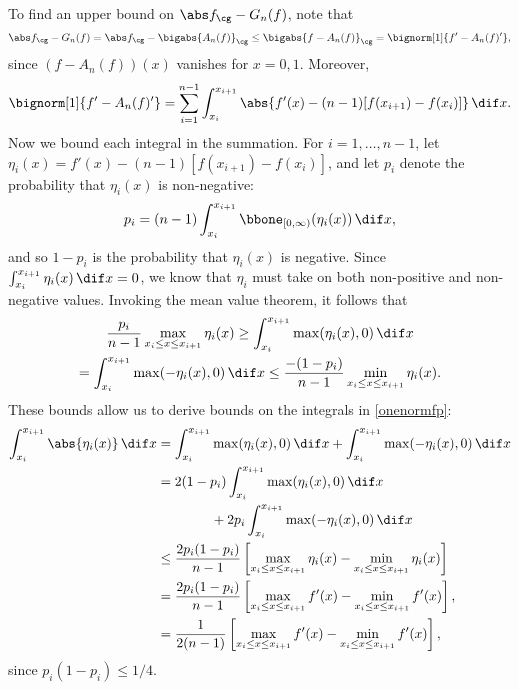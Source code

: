 To find an upper bound on $\Gnorm{f}-G_{n}(f)$, note that
\begin{equation*}
\Gnorm{f} - G_{n}(f) = \Gnorm{f} - \bigabs{A_n(f)}_{\cg} \le \bigabs{f-A_n(f)}_{\cg} = \bignorm[1]{f' -A_n(f)'},
\end{equation*}
since $(f-A_n(f))(x)$ vanishes for $x=0,1$.  Moreover,
\begin{equation} \label{onenormfp}
\bignorm[1]{f' -A_n(f)'} = \sum_{i=1}^{n-1} \int_{x_i}^{x_{i+1}} \abs{f'(x) -(n-1)[f(x_{i+1})-f(x_i)]} \, \dif x.
\end{equation}
Now we bound each integral in the summation.  For $i=1, \ldots, n-1$, let $\eta_i(x) = f'(x) -(n-1)[f(x_{i+1})-f(x_i)]$, and let $p_i$ denote the probability that $\eta_i(x)$ is non-negative:
\[
p_i = (n-1)\int_{x_i}^{x_{i+1}} \bbone_{[0,\infty)} (\eta_i(x)) \, \dif x,
\]
and so $1-p_i$ is the probability that $\eta_i(x)$ is negative.  Since $\int_{x_i}^{x_{i+1}} \eta_i(x) \, \dif x =0$, we know that $\eta_i$ must take on both non-positive and non-negative values.  Invoking the mean value theorem, it follows that
\begin{multline*}
\frac{p_i}{n-1} \max_{x_i \le x \le x_{i+1}} \eta_i(x) \ge \int_{x_i}^{x_{i+1}} \max(\eta_i(x),0) \, \dif x \\
= \int_{x_i}^{x_{i+1}} \max(-\eta_i(x),0) \, \dif x \le \frac{-(1-p_i)}{n-1} \min_{x_i \le x \le x_{i+1}} \eta_i(x) .
\end{multline*}
These bounds allow us to derive bounds on the integrals in \eqref{onenormfp}:
\begin{align*}
\int_{x_i}^{x_{i+1}} \abs{\eta_i(x)} \, \dif x &= \int_{x_i}^{x_{i+1}} \max(\eta_i(x),0) \, \dif x + \int_{x_i}^{x_{i+1}} \max(-\eta_i(x),0) \, \dif x\\
&=2(1-p_i) \int_{x_i}^{x_{i+1}} \max(\eta_i(x),0) \, \dif x \\
& \qquad \qquad + 2p_i\int_{x_i}^{x_{i+1}} \max(-\eta_i(x),0) \, \dif x\\
&\le \frac{2p_i(1-p_i)}{n-1} \left[ \max_{x_i \le x \le x_{i+1}} \eta_i(x) - \min_{x_i \le x \le x_{i+1}} \eta_i(x) \right]\\
&=\frac{2p_i(1-p_i)}{n-1} \left[ \max_{x_i \le x \le x_{i+1}} f'(x) - \min_{x_i \le x \le x_{i+1}} f'(x) \right], \\
&=\frac{1}{2(n-1)} \left[ \max_{x_i \le x \le x_{i+1}} f'(x) - \min_{x_i \le x \le x_{i+1}} f'(x) \right],
\end{align*}
since $p_i(1-p_i)\le 1/4$.

